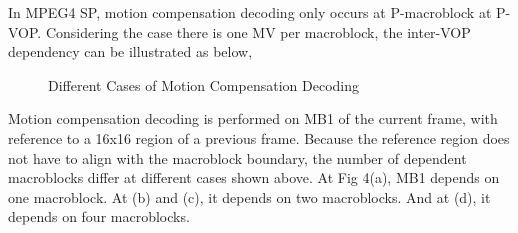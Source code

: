 In MPEG4 SP, motion compensation decoding only occurs at P-macroblock at P-VOP. Considering the case there is one MV per macroblock, the inter-VOP dependency can be illustrated as below,
\begin{figure}
\centering
\quad
{}
\quad
{}
\quad
{}
\caption{Different Cases of Motion Compensation Decoding}
\end{figure}
Motion compensation decoding is performed on MB1 of the current frame, with reference to a 16x16 region of a previous frame. Because the reference region does not have to align with the macroblock boundary, the number of dependent macroblocks differ at different cases shown above. At Fig 4(a), MB1 depends on one macroblock. At (b) and (c), it depends on two macroblocks. And at (d), it depends on four macroblocks. 

